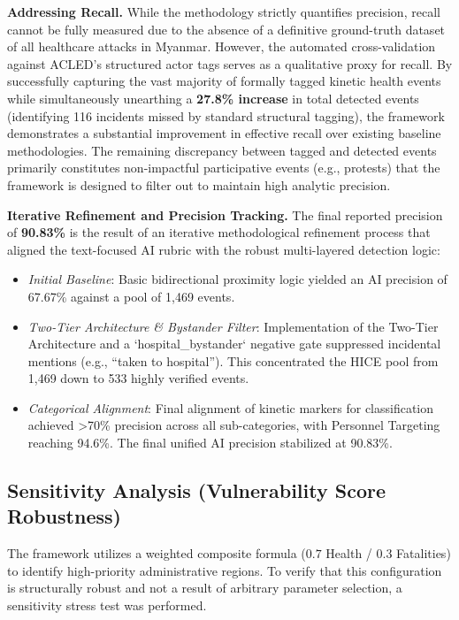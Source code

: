 \documentclass[conference]{IEEEtran}
\begin{document}
\textbf{Addressing Recall.}
While the methodology strictly quantifies precision, recall cannot be fully measured due to the absence of a definitive ground-truth dataset of all healthcare attacks in Myanmar. However, the automated cross-validation against ACLED's structured actor tags serves as a qualitative proxy for recall. By successfully capturing the vast majority of formally tagged kinetic health events while simultaneously unearthing a \textbf{27.8\% increase} in total detected events (identifying 116 incidents missed by standard structural tagging), the framework demonstrates a substantial improvement in effective recall over existing baseline methodologies. The remaining discrepancy between tagged and detected events primarily constitutes non-impactful participative events (e.g., protests) that the framework is designed to filter out to maintain high analytic precision.

\textbf{Iterative Refinement and Precision Tracking.}
The final reported precision of \textbf{90.83\%} is the result of an iterative methodological refinement process that aligned the text-focused AI rubric with the robust multi-layered detection logic:
\begin{itemize}
    \item \textit{Initial Baseline}: Basic bidirectional proximity logic yielded an AI precision of 67.67\% against a pool of 1,469 events.
    \item \textit{Two-Tier Architecture \& Bystander Filter}: Implementation of the Two-Tier Architecture and a `hospital\_bystander` negative gate suppressed incidental mentions (e.g., ``taken to hospital''). This concentrated the HICE pool from 1,469 down to 533 highly verified events.
    \item \textit{Categorical Alignment}: Final alignment of kinetic markers for classification achieved >70\% precision across all sub-categories, with Personnel Targeting reaching 94.6\%. The final unified AI precision stabilized at 90.83\%.
\end{itemize}

\subsection{Sensitivity Analysis (Vulnerability Score Robustness)}
The framework utilizes a weighted composite formula ($0.7$ Health / $0.3$ Fatalities) to identify high-priority administrative regions. To verify that this configuration is structurally robust and not a result of arbitrary parameter selection, a sensitivity stress test was performed. 
\end{document}
